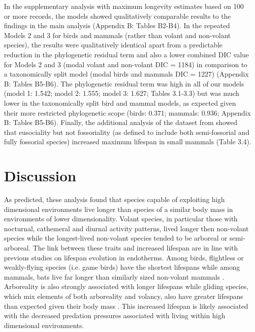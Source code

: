 In the supplementary analysis with maximum longevity estimates based on 100 or more records, the models showed qualitatively comparable results to the findings in the main analysis (Appendix B: Tables B2-B4). In the repeated Models 2 and 3 for birds and mammals (rather than volant and non-volant species), the results were qualitatively identical apart from a predictable reduction in the phylogenetic residual term and also a lower combined DIC value for Models 2 and 3 (modal volant and non-volant DIC = 1184) in comparison to a taxonomically split model (modal birds and mammals DIC  = 1227) (Appendix B: Tables B5-B6). The phylogenetic residual term was high in all of our models (model 1: 1.542; model 2: 1.555; model 3: 1.627; Tables 3.1-3.3) but was much lower in the taxonomically split bird and mammal models, as expected given their more restricted phylogenetic scope (birds: 0.371; mammals: 0.936; Appendix B: Tables B5-B6). Finally, the additional analysis of the dataset from \cite{williams2015ecology} showed that eusociality but not fossoriality (as defined to include both semi-fossorial and fully fossorial species) increased maximum lifespan in small mammals (Table 3.4).



\section{Discussion}

As predicted, these analysis found that species capable of exploiting high dimensional environments live longer than species of a similar body mass in environments of lower dimensionality. Volant species, in particular those with nocturnal, cathemeral and diurnal activity patterns, lived longer then non-volant species while the longest-lived non-volant species tended to be arboreal or semi-arboreal. The link between these traits and increased lifespan are in line with previous studies on lifespan evolution in endotherms. Among birds, flightless or weakly-flying species (i.e. game birds) have the shortest lifespans \citep{ricklefs2010life,Williams1957,wilkinson2002life} while among mammals, bats live far longer than similarly sized non-volant mammals \citep{wilkinson2002life,austad1991mammalian}. Arboreality is also strongly associated with longer lifespans \citep{shattuck2010arboreality} while gliding species, which mix elements of both arboreality and volancy, also have greater lifespans than expected given their body mass \citep{holmes1994fly}. This increased lifespan is likely associated with the decreased predation pressures associated with living within high dimensional environments.


